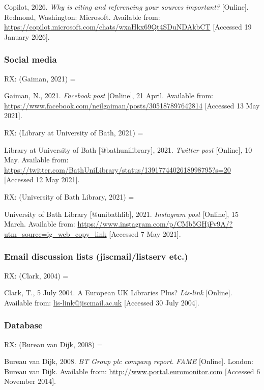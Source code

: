 Copilot, 2026. \emph{Why is citing and referencing your sources important?} [Online]. Redmond, Washington: Microsoft. Available from: \url{https://copilot.microsoft.com/chats/wxaHkx69Qt4SDuNDAkbCT} [Accessed 19 January 2026].



\subsubsection*{Social media}

RX: (Gaiman, 2021) = \cite{gaiman2021fbp}

Gaiman, N., 2021. \emph{Facebook post} [Online], 21 April. Available from: \url{https://www.facebook.com/neilgaiman/posts/305187897642814} [Accessed 13 May 2021].


RX: (Library at University of Bath, 2021) = \cite{ublib2021tp}

Library at University of Bath [@bathunilibrary], 2021. \emph{Twitter post} [Online], 10 May. Available from: \url{https://twitter.com/BathUniLibrary/status/1391774402618998795?s=20} [Accessed 12 May 2021].


RX: (University of Bath Library, 2021) = \cite{ublib2021ip}

University of Bath Library [@unibathlib], 2021. \emph{Instagram post} [Online], 15 March. Available from: \url{https://www.instagram.com/p/CMb5GHjFv9A/?utm_source=ig_web_copy_link} [Accessed 7 May 2021].



\subsubsection*{Email discussion lists (jiscmail\slash listserv etc.)}

RX: (Clark, 2004) = \cite{clark2004euk}

Clark, T., 5 July 2004. A European UK Libraries Plus? \emph{Lis-link} [Online]. Available from: \url{lis-link@jiscmail.ac.uk} [Accessed 30 July 2004].



\subsubsection*{Database}

RX: (Bureau van Dijk, 2008) = \cite{bvd2008bt}

Bureau van Dijk, 2008. \emph{BT Group plc company report}. \emph{FAME} [Online]. London: Bureau van Dijk. Available from: \url{http://www.portal.euromonitor.com} [Accessed 6 November 2014].



